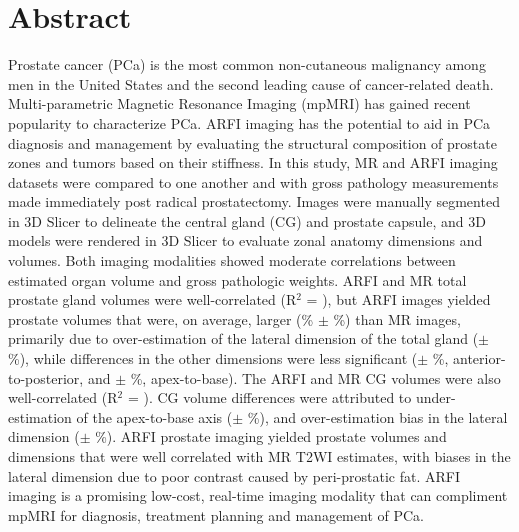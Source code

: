 \section*{Abstract}
Prostate cancer (PCa) is the most common non-cutaneous malignancy among men in
the United States and the second leading cause of cancer-related death.
Multi-parametric Magnetic Resonance Imaging (mpMRI) has gained recent
popularity to characterize PCa.  ARFI imaging has the potential to aid in PCa
diagnosis and management by evaluating the structural composition of prostate
zones and tumors based on their stiffness.  In this study, \invivo MR and ARFI
imaging datasets were compared to one another and with gross pathology
measurements made immediately post radical prostatectomy.  Images were manually
segmented in 3D Slicer to delineate the central gland (CG) and prostate
capsule, and 3D models were rendered in 3D Slicer to evaluate zonal anatomy
dimensions and volumes.  Both imaging modalities showed moderate correlations
between estimated organ volume and gross pathologic weights.  ARFI and MR total
prostate gland volumes were well-correlated (R$^2$ = \MRarfiVolTotalRsq), but
ARFI images yielded prostate volumes that were, on average, larger
(\MRarfiVolTotalMeanDiff\% $\pm$ \MRarfiVolTotalStdDiff\%) than MR images,
primarily due to over-estimation of the lateral dimension of the total gland
(\ARFImrTotalLatLatMeanPct $\pm$ \ARFImrTotalLatLatStdPct\%), while differences
in the other dimensions were less significant (\ARFImrTotalAntPostMeanPct $\pm$
\ARFImrTotalAntPostStdPct\%, anterior-to-posterior, and
\ARFImrTotalApexBaseMeanPct $\pm$ \ARFImrTotalApexBaseStdPct\%, apex-to-base).
The ARFI and MR CG volumes were also well-correlated (R$^2$ =
\MRarfiVolCentralRsq).  CG volume differences were attributed to
under-estimation of the apex-to-base axis (\ARFImrCentralApexBaseMeanPct $\pm$
\ARFImrCentralApexBaseStdPct\%), and over-estimation bias in the lateral
dimension (\ARFImrCentralLatLatMeanPct $\pm$ \ARFImrCentralLatLatStdPct\%).
ARFI prostate imaging yielded prostate volumes and dimensions that were well
correlated with MR T2WI estimates, with biases in the lateral dimension due to
poor contrast caused by peri-prostatic fat.  ARFI imaging is a promising
low-cost, real-time imaging modality that can compliment mpMRI for diagnosis,
treatment planning and management of PCa.
